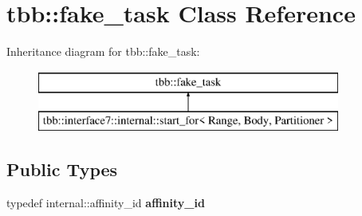 \hypertarget{classtbb_1_1fake__task}{}\section{tbb\+:\+:fake\+\_\+task Class Reference}
\label{classtbb_1_1fake__task}
Inheritance diagram for tbb\+:\+:fake\+\_\+task\+:\begin{figure}[H]
\begin{center}
\leavevmode
\includegraphics[height=2.000000cm]{classtbb_1_1fake__task}
\end{center}
\end{figure}
\subsection*{Public Types}
\begin{DoxyCompactItemize}
\item 
\hypertarget{classtbb_1_1fake__task_a577abd93801e9ed4876f3e93a094f560}{}typedef internal\+::affinity\+\_\+id {\bfseries affinity\+\_\+id}\label{classtbb_1_1fake__task_a577abd93801e9ed4876f3e93a094f560}

\end{DoxyCompactItemize}
